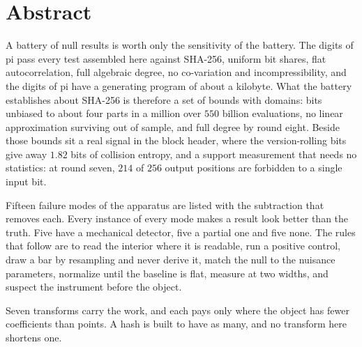 \chapter*{Abstract}

A battery of null results is worth only the sensitivity of the battery. The digits of pi pass every
test assembled here against SHA-256, uniform bit shares, flat autocorrelation, full algebraic degree,
no co-variation and incompressibility, and the digits of pi have a generating program of about a
kilobyte. What the battery establishes about SHA-256 is therefore a set of bounds with domains: bits
unbiased to about four parts in a million over \(550\) billion evaluations, no linear approximation
surviving out of sample, and full degree by round eight. Beside those bounds sit a real signal in the
block header, where the version-rolling bits give away \(1.82\) bits of collision entropy, and a
support measurement that needs no statistics: at round seven, \(214\) of \(256\) output positions
are forbidden to a single input bit.

Fifteen failure modes of the apparatus are listed with the subtraction that removes each. Every
instance of every mode makes a result look better than the truth. Five have a mechanical detector,
five a partial one and five none. The rules that follow are to read the interior where it is
readable, run a positive control, draw a bar by resampling and never derive it, match the null to the
nuisance parameters, normalize until the baseline is flat, measure at two widths, and suspect the
instrument before the object.

Seven transforms carry the work, and each pays only where the object has fewer coefficients than
points. A hash is built to have as many, and no transform here shortens one.
\cleardoublepage
